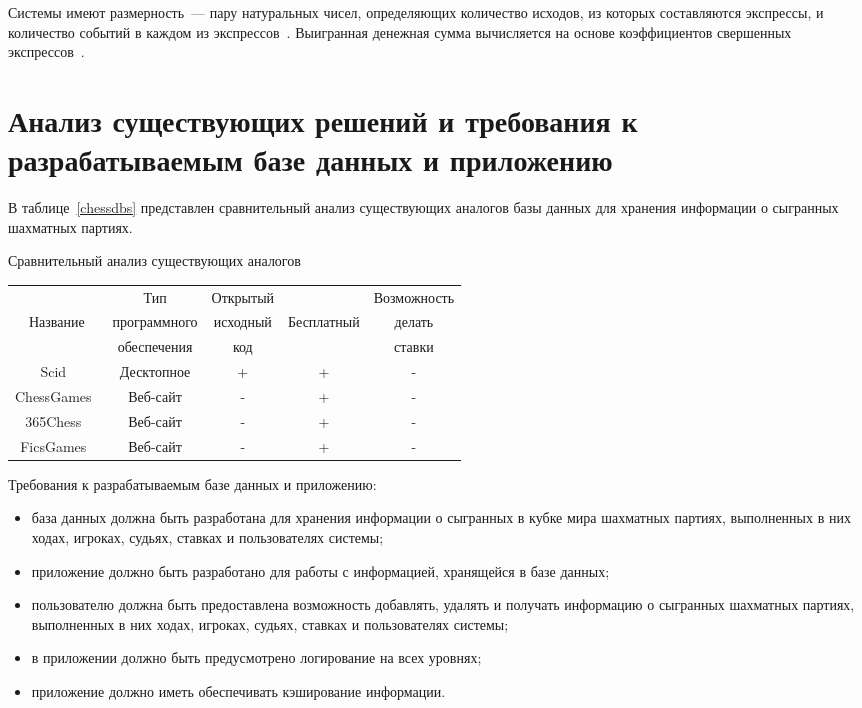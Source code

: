 Системы имеют размерность~--- пару натуральных чисел, определяющих количество исходов, из которых составляются экспрессы, и количество событий в каждом из экспрессов~\cite{bet}.
Выигранная денежная сумма вычисляется на основе коэффициентов свершенных экспрессов~\cite{bet}.

\section[Анализ существующих решений и требования к разрабатываемым базе данных и приложению]{Анализ существующих решений и требования к\\разрабатываемым базе данных и приложению}

В таблице~\ref{chessdbs} представлен сравнительный анализ существующих аналогов базы данных для хранения информации о сыгранных шахматных партиях.
\begin{center}
	\begin{threeparttable}
		\captionsetup{justification=raggedright,singlelinecheck=off}
		\caption{\label{chessdbs}Сравнительный анализ существующих аналогов}
		\centering
		\begin{tabular}{|c|c|c|c|c|}
			\hline
			& Тип & Открытый && Возможность\\
			Название & программного & исходный &  Бесплатный & делать\\
			& обеспечения & код && ставки\\
			\hline
			Scid~\cite{scid} & Десктопное & + & + & -\\
			\hline
			ChessGames~\cite{chessgamescom} & Веб-сайт & - & + & -\\
			\hline
			365Chess~\cite{365chess} & Веб-сайт & - & + & -\\
			\hline
			FicsGames~\cite{fics} & Веб-сайт & - & + & -\\
			\hline
		\end{tabular}
	\end{threeparttable}
\end{center}

Требования к разрабатываемым базе данных и приложению:
\begin{itemize}
	\item база данных должна быть разработана для хранения информации о сыгранных в кубке мира шахматных партиях, выполненных в них ходах, игроках, судьях, ставках и пользователях системы;
	\item приложение должно быть разработано для работы с информацией, хранящейся в базе данных;
	\item пользователю должна быть предоставлена возможность добавлять, удалять и получать информацию о сыгранных шахматных партиях, выполненных в них ходах, игроках, судьях, ставках и пользователях системы;
	\item в приложении должно быть предусмотрено логирование на всех уровнях;
	\item приложение должно иметь обеспечивать кэширование информации.
\end{itemize}

